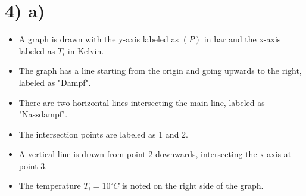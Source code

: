 \section*{4) a)}

\begin{itemize}
    \item A graph is drawn with the y-axis labeled as \( (P) \) in bar and the x-axis labeled as \( T_i \) in Kelvin.
    \item The graph has a line starting from the origin and going upwards to the right, labeled as "Dampf".
    \item There are two horizontal lines intersecting the main line, labeled as "Nassdampf".
    \item The intersection points are labeled as 1 and 2.
    \item A vertical line is drawn from point 2 downwards, intersecting the x-axis at point 3.
    \item The temperature \( T_i = 10^\circ C \) is noted on the right side of the graph.
\end{itemize}